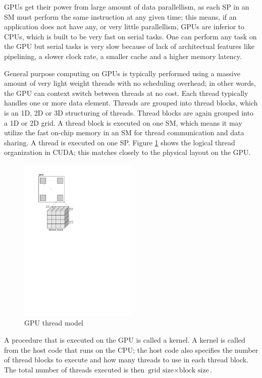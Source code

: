 GPUs get their power from large amount of data parallellism, as each SP in an SM must perform the same instruction at any given time; this means, if an application does not have any, or very little parallellism, GPUs are inferior to CPUs, which is built to be very fast on serial tasks. One can perform any task on the GPU but serial tasks is very slow because of lack of architectual features like pipelining, a slower clock rate, a smaller cache and a higher memory latency.

General purpose computing on GPUs is typically performed using a massive amount of very light weight threads with no scheduling overhead; in other words, the GPU can context switch between threads at no cost. Each thread typically handles one or more data element. Threads are grouped into thread blocks, which is an 1D, 2D or 3D structuring of threads. Thread blocks are again grouped into a 1D or 2D grid. A thread block is executed on one SM, which means it may utilize the fast on-chip memory in an SM for thread communication and data sharing. A thread is executed on one SP. Figure \ref{fig:gpu_thread_model} shows the logical thread organization in CUDA; this matches closely to the physical layout on the GPU.

\begin{figure}[ht]
\centering
\includegraphics[width=0.5\textwidth]{figure/gpu_thread_model}
\caption{GPU thread model}
\label{fig:gpu_thread_model}
\end{figure}

A procedure that is executed on the GPU is called a kernel. A kernel is called from the host code that runs on the CPU; the host code also specifies the number of thread blocks to execute and how many threads to use in each thread block. The total number of threads executed is then $\mbox{grid size}\times \mbox{block size}$. 

